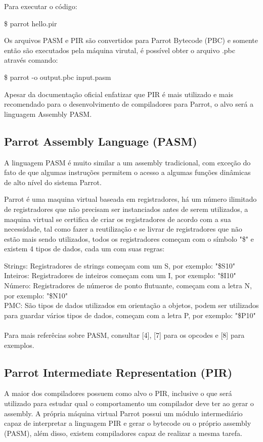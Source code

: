 \documentclass[12pt,a4paper,twoside]{report}
\begin{document}

Para executar o código:
\begin{terminal}
\$ parrot hello.pir
\end{terminal}

Os arquivos PASM e PIR são convertidos para Parrot Bytecode (PBC) e somente então são executados pela máquina virutal, é possível obter o arquivo .pbc através comando:
\begin{terminal}
\$ parrot -o output.pbc input.pasm
\end{terminal}

Apesar da documentação oficial enfatizar que PIR é mais utilizado e mais recomendado para o desenvolvimento de compiladores para Parrot, o alvo será a linguagem Assembly PASM.

\subsection{Parrot Assembly Language (PASM)}
A linguagem PASM é muito similar a um assembly tradicional, com exceção do fato de que algumas instruções permitem o acesso a algumas funções dinâmicas de alto nível do sistema Parrot.

Parrot é uma maquina virtual baseada em registradores, há um número ilimitado de registradores que não precisam ser instanciados antes de serem utilizados, a maquina virtual se certifica de criar os registradores de acordo com a sua necessidade,
tal como fazer a reutilização e se livrar de registradores que não estão mais sendo utilizados, todos os registradores começam com o símbolo "\$" e existem 4 tipos de dados, cada um com suas regras:


Strings: Registradores de strings começam com um S, por exemplo: "\$S10" \\
Inteiros: Registradores de inteiros começam com um I, por exemplo: "\$I10" \\
Número: Registradores de números de ponto flutuante, começam com a letra N, por exemplo: "\$N10" \\
PMC: São tipos de dados utilizados em orientação a objetos, podem ser utilizados para guardar vários tipos de dados, começam com a letra P, por exemplo: "\$P10" \\
\\
Para mais referêcias sobre PASM, consultar [4], [7] para os opcodes e [8] para exemplos.

\subsection{Parrot Intermediate Representation (PIR)}
A maior dos compiladores possuem como alvo o PIR, inclusive o que será
utilizado para estudar qual o comportamento um compilador deve ter ao
gerar o assembly.
A própria máquina virtual Parrot possui um módulo intermediário capaz
de interpretar a linguagem PIR e gerar o bytecode ou o próprio
assembly (PASM), além disso, existem compiladores capaz de realizar a
mesma tarefa.
\end{document}
